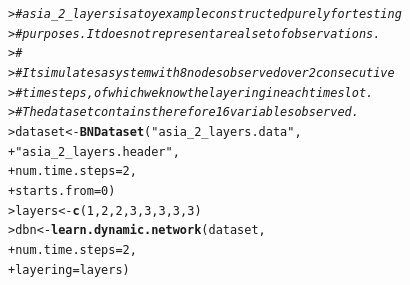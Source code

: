 \documentclass{article}\usepackage[]{graphicx}\usepackage[]{color}
\makeatletter
\newcommand{\hlnum}[1]{\textcolor[rgb]{0.686,0.059,0.569}{#1}}%
\newcommand{\hlstr}[1]{\textcolor[rgb]{0.192,0.494,0.8}{#1}}%
\newcommand{\hlcom}[1]{\textcolor[rgb]{0.678,0.584,0.686}{\textit{#1}}}%
\newcommand{\hlstd}[1]{\textcolor[rgb]{0.345,0.345,0.345}{#1}}%
\newcommand{\hlkwb}[1]{\textcolor[rgb]{0.69,0.353,0.396}{#1}}%
\newcommand{\hlkwc}[1]{\textcolor[rgb]{0.333,0.667,0.333}{#1}}%
\newcommand{\hlkwd}[1]{\textcolor[rgb]{0.737,0.353,0.396}{\textbf{#1}}}%
\newenvironment{kframe}{%
 \def\at@end@of@kframe{}%
 \ifinner\ifhmode%
  \def\at@end@of@kframe{\end{minipage}}%
  \begin{minipage}{\columnwidth}%
 \fi\fi%
 \def\FrameCommand##1{\hskip\@totalleftmargin \hskip-\fboxsep
 \colorbox{shadecolor}{##1}\hskip-\fboxsep
     \hskip-\linewidth \hskip-\@totalleftmargin \hskip\columnwidth}%
 \MakeFramed {\advance\hsize-\width
   \@totalleftmargin\z@ \linewidth\hsize
   \@setminipage}}%
 {\par\unskip\endMakeFramed%
 \at@end@of@kframe}
\newenvironment{knitrout}{}{} %
\makeatother
\begin{document}
\begin{knitrout}
\color{fgcolor}\begin{kframe}
\begin{alltt}
\hlstd{> }\hlcom{# asia_2_layers is a toy example constructed purely for testing}
\hlstd{> }\hlcom{# purposes. It does not represent a real set of observations.}
\hlstd{> }\hlcom{#}
\hlstd{> }\hlcom{# It simulates a system with 8 nodes observed over 2 consecutive}
\hlstd{> }\hlcom{# time steps, of which we know the layering in each time slot.}
\hlstd{> }\hlcom{# The dataset contains therefore 16 variables observed.}
\hlstd{> }\hlstd{dataset} \hlkwb{<-} \hlkwd{BNDataset}\hlstd{(}\hlstr{"asia_2_layers.data"}\hlstd{,}
\hlstd{+ }                     \hlstr{"asia_2_layers.header"}\hlstd{,}
\hlstd{+ }                     \hlkwc{num.time.steps} \hlstd{=} \hlnum{2}\hlstd{,}
\hlstd{+ }                     \hlkwc{starts.from} \hlstd{=} \hlnum{0}\hlstd{)}
\hlstd{> }\hlstd{layers} \hlkwb{<-} \hlkwd{c}\hlstd{(}\hlnum{1}\hlstd{,}\hlnum{2}\hlstd{,}\hlnum{2}\hlstd{,}\hlnum{3}\hlstd{,}\hlnum{3}\hlstd{,}\hlnum{3}\hlstd{,}\hlnum{3}\hlstd{,}\hlnum{3}\hlstd{)}
\hlstd{> }\hlstd{dbn} \hlkwb{<-} \hlkwd{learn.dynamic.network}\hlstd{(dataset,}
\hlstd{+ }                             \hlkwc{num.time.steps} \hlstd{=} \hlnum{2}\hlstd{,}
\hlstd{+ }                             \hlkwc{layering} \hlstd{= layers)}
\end{alltt}
\end{kframe}
\end{knitrout}
\end{document}

